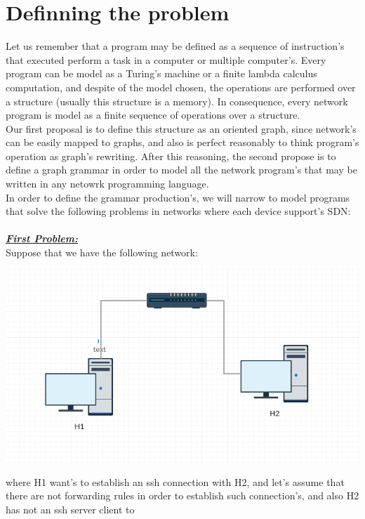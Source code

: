\documentclass[envcountsect,runningheads]{llncs}
\begin{document}
\section{Definning the problem}

Let us remember that a program may be defined as a sequence of instruction's that executed 
perform a task in a computer or multiple computer's. Every program can be model as a Turing's 
machine or a finite lambda calculus computation, and despite of the model chosen, the 
operations are performed over a structure (usually this structure is a memory). In consequence,
every network program is model as a finite sequence of operations over a structure.\\
Our first proposal is to define this structure as an oriented graph, since network's 
can be easily mapped to graphs, and also is perfect reasonably to think 
program's operation as graph's rewriting. After this reasoning, the second propose is to define
a graph grammar in order to model all the network program's that may be written in any netowrk
programming language. \\
In order to define the grammar production's, we will narrow to model 
programs that solve the following problems in networks where each device support's SDN:\\
\\
\textbf{\underline{\textit{First Problem:}}} \\
Suppose that we have the following network:\\
\includegraphics[width=\textwidth, height=8cm]{first_example.png}\\  
where H1 want's to establish an ssh 
connection with H2, and let's assume that there are not forwarding rules in 
order to establish such connection's, and also H2 has not an ssh server client to 
\end{document}
